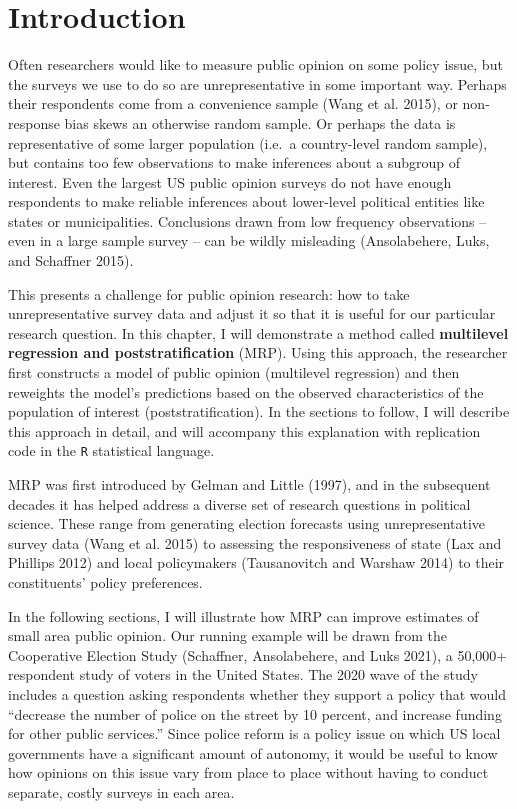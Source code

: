 \documentclass[
]{article}
\begin{document}
\hypertarget{introduction}{%
\section{Introduction}\label{introduction}}

Often researchers would like to measure public opinion on some policy
issue, but the surveys we use to do so are unrepresentative in some
important way. Perhaps their respondents come from a convenience sample
(Wang et al. 2015), or non-response bias skews an otherwise random
sample. Or perhaps the data is representative of some larger population
(i.e.~a country-level random sample), but contains too few observations
to make inferences about a subgroup of interest. Even the largest US
public opinion surveys do not have enough respondents to make reliable
inferences about lower-level political entities like states or
municipalities. Conclusions drawn from low frequency observations --
even in a large sample survey -- can be wildly misleading (Ansolabehere,
Luks, and Schaffner 2015).

This presents a challenge for public opinion research: how to take
unrepresentative survey data and adjust it so that it is useful for our
particular research question. In this chapter, I will demonstrate a
method called \textbf{multilevel regression and poststratification}
(MRP). Using this approach, the researcher first constructs a model of
public opinion (multilevel regression) and then reweights the model's
predictions based on the observed characteristics of the population of
interest (poststratification). In the sections to follow, I will
describe this approach in detail, and will accompany this explanation
with replication code in the \texttt{R} statistical language.

MRP was first introduced by Gelman and Little (1997), and in the
subsequent decades it has helped address a diverse set of research
questions in political science. These range from generating election
forecasts using unrepresentative survey data (Wang et al. 2015) to
assessing the responsiveness of state (Lax and Phillips 2012) and local
policymakers (Tausanovitch and Warshaw 2014) to their constituents'
policy preferences.

In the following sections, I will illustrate how MRP can improve
estimates of small area public opinion. Our running example will be
drawn from the Cooperative Election Study (Schaffner, Ansolabehere, and
Luks 2021), a 50,000+ respondent study of voters in the United States.
The 2020 wave of the study includes a question asking respondents
whether they support a policy that would ``decrease the number of police
on the street by 10 percent, and increase funding for other public
services.'' Since police reform is a policy issue on which US local
governments have a significant amount of autonomy, it would be useful to
know how opinions on this issue vary from place to place without having
to conduct separate, costly surveys in each area.
\end{document}
